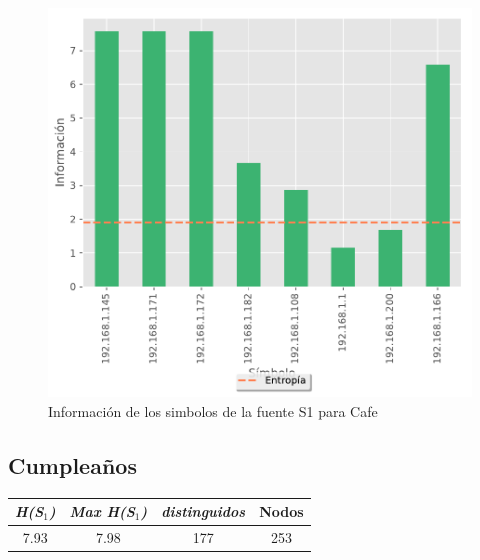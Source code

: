 
\begin{figure}[htb]
	\centering
	
\end{figure}

\begin{figure}
  \begin{center}
    \includegraphics[scale = 0.5]{img/Cafe-information-S1.pdf}
    \caption{Información de los simbolos de la fuente S1 para Cafe}
    \label{informacion_cafe}
  \end{center}
\end{figure}

\subsection*{\textbf{Cumpleaños}}

\begin{center}\small
	\begin{tabular}{ c | c | c | c }
	  \textit{H(S$_1$)} & \textit{Max H(S$_1$)} & \textbar \textit{distinguidos}\textbar & \textbar Nodos\textbar \\
	  \hline
	  7.93 & 7.98 & 177 & 253 \\
	\end{tabular}
\end{center}

